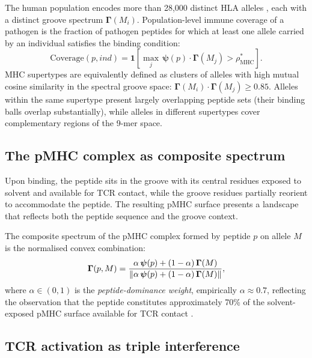 The human population encodes more than 28,000 distinct HLA alleles
\citep{robinson2015}, each with a distinct groove spectrum $\bm{\Gamma}(M_i)$.
Population-level immune coverage of a pathogen is the fraction of pathogen
peptides for which at least one allele carried by an individual satisfies the
binding condition:
\begin{equation}
  \mathrm{Coverage}(p, \mathit{ind}) = \mathbf{1}\!\left[
    \max_{j}\, \bm{\psi}(p)\cdot\bm{\Gamma}(M_j) > \rho^*_{\mathrm{MHC}}
  \right].
  \label{im:eq:coverage}
\end{equation}
MHC supertypes \citep{sette1999} are equivalently defined as clusters of
alleles with high mutual cosine similarity in the spectral groove space:
$\bm{\Gamma}(M_i)\cdot\bm{\Gamma}(M_j) \geq 0.85$. Alleles within the same
supertype present largely overlapping peptide sets (their binding balls overlap
substantially), while alleles in different supertypes cover complementary
regions of the 9-mer space.

\subsection{The pMHC complex as composite spectrum}
\label{im:sec:pmhc_composite}

Upon binding, the peptide sits in the groove with its central residues exposed
to solvent and available for TCR contact, while the groove residues partially
reorient to accommodate the peptide. The resulting pMHC surface presents a
landscape that reflects both the peptide sequence and the groove context.

\begin{definition}
\label{im:def:pmhc_composite}
The composite spectrum of the pMHC complex formed by peptide $p$ on allele
$M$ is the normalised convex combination:
\begin{equation}
  \bm{\Gamma}(p,M)
  = \frac{\alpha\,\bm{\psi}(p) + (1-\alpha)\,\bm{\Gamma}(M)}
         {\norm{\alpha\,\bm{\psi}(p) + (1-\alpha)\,\bm{\Gamma}(M)}},
  \label{im:eq:pmhc_composite}
\end{equation}
where $\alpha \in (0,1)$ is the \emph{peptide-dominance weight}, empirically
$\alpha \approx 0.7$, reflecting the observation that the peptide constitutes
approximately 70\% of the solvent-exposed pMHC surface available for TCR
contact \citep{neefjes2011}.
\end{definition}

\subsection{TCR activation as triple interference}
\label{im:sec:tcr_activation}


